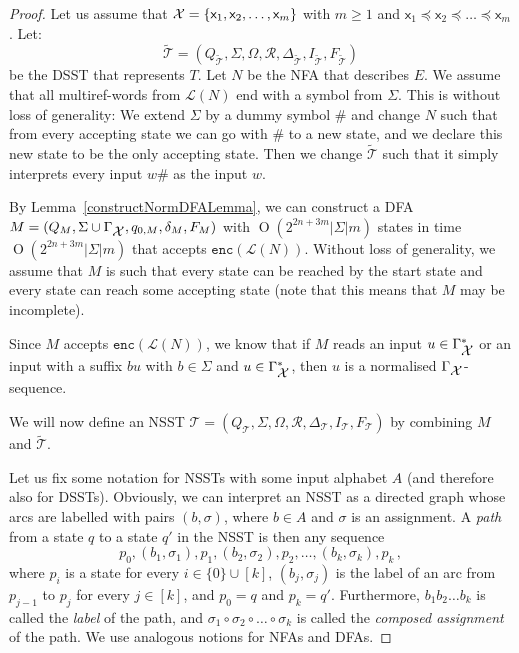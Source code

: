 \documentclass[
a4paper
]{article}
\theoremstyle{plain}
\theoremstyle{definition}
\theoremstyle{remark}
\newcommand{\varset}{\mbox{\ensuremath{\mathcal{X}}}}
\newcommand{\varsx}{\ensuremath{\textsf{x}}}
\newcommand{\lang}[1]{\ensuremath{\mathcal{L}(#1)}}
\newcommand{\nrefw}[1]{\ensuremath{\mathtt{enc}(#1)}}
\newcommand{\Reg}{\mathcal{R}}
\newcommand{\sst}{\mathcal{T}}
\DeclareMathOperator{\bigo}{O}
\begin{document}
\begin{proof}
Let us assume that $\varset = \{\varsx_1, \varsx_2, \ldots, \varsx_m\}$ with $m \geq 1$ and $\varsx_1 \preceq \varsx_2 \preceq \ldots \preceq \varsx_m$. Let:
$$
\widetilde{\sst} = (Q_{\widetilde{\sst}}, \Sigma, \Omega,  \Reg, \Delta_{\widetilde{\sst}}, I_{\widetilde{\sst}}, F_{\widetilde{\sst}})
$$ 
be the DSST that represents $T$. Let $N$ be the NFA that describes $E$. We assume that all multiref-words from $\lang{N}$ end with a symbol from $\Sigma$. This is without loss of generality: We extend $\Sigma$ by a dummy symbol $\#$ and change $N$ such that from every accepting state we can go with $\#$ to a new state, and we declare this new state to be the only accepting state. Then we change $\widetilde{\sst}$ such that it simply interprets every input $w \#$ as the input $w$. \par

By Lemma~\ref{constructNormDFALemma}, we can construct a DFA $M = (Q_{M}, \Sigma \cup \Gamma_{\varset}, q_{0, M}, \delta_M, F_M)$ with $\bigo(2^{2n+3m} |\Sigma| m)$ states in time $\bigo(2^{2n+3m} |\Sigma| m)$ that accepts $\nrefw{\lang{N}}$. Without loss of generality, we assume that $M$ is such that every state can be reached by the start state and every state can reach some accepting state (note that this means that $M$ may be incomplete).


Since $M$ accepts $\nrefw{\lang{N}}$, we know that if $M$ reads an input $u \in \Gamma_{\varset}^*$ or an input with a suffix $b u$ with $b \in \Sigma$ and $u \in \Gamma_{\varset}^*$, then $u$ is a normalised $\Gamma_{\varset}$-sequence.

We will now define an NSST $\sst = (Q_{\sst}, \Sigma, \Omega, \Reg, \Delta_{\sst}, I_{\sst}, F_{\sst})$ by combining $M$ and $\widetilde{\sst}$. 

Let us fix some notation for NSSTs with some input alphabet $A$ (and therefore also for DSSTs). Obviously, we can interpret an NSST as a directed graph whose arcs are labelled with pairs $(b, \sigma)$, where $b \in A$ and $\sigma$ is an assignment. A \emph{path} from a state $q$ to a state $q'$ in the NSST is then any sequence 
\begin{equation*}
p_0, (b_1, \sigma_1), p_1, (b_2, \sigma_2), p_2, \ldots, (b_k, \sigma_k), p_k\,, 
\end{equation*}
where $p_i$ is a state for every $i \in \{0\} \cup [k]$, $(b_j, \sigma_j)$ is the label of an arc from $p_{j-1}$ to $p_j$ for every $j \in [k]$, and $p_0 = q$ and $p_k = q'$. Furthermore, $b_1 b_2 \ldots b_k$ is called the \emph{label} of the path, and $\sigma_1 \circ \sigma_2 \circ \ldots \circ \sigma_k$ is called the \emph{composed assignment} of the path. We use analogous notions for NFAs and DFAs.


\end{proof}
\end{document}
